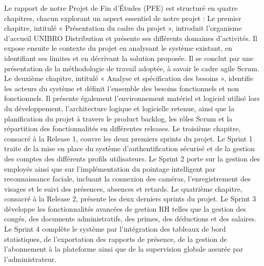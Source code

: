 Le rapport de notre Projet de Fin d’Études (PFE) est structuré en quatre chapitres, chacun explorant un aspect essentiel de notre projet :
Le premier chapitre, intitulé « Présentation du cadre du projet », introduit l’organisme d’accueil UNIBRO Distribution et présente ses différents domaines d’activités. Il expose ensuite le contexte du projet en analysant le système existant, en identifiant ses limites et en décrivant la solution proposée. Il se conclut par une présentation de la méthodologie de travail adoptée, à savoir le cadre agile Scrum.
Le deuxième chapitre, intitulé « Analyse et spécification des besoins », identifie les acteurs du système et définit l’ensemble des besoins fonctionnels et non fonctionnels. Il présente également l’environnement matériel et logiciel utilisé lors du développement, l’architecture logique et logicielle retenue, ainsi que la planification du projet à travers le product backlog, les rôles Scrum et la répartition des fonctionnalités en différentes releases.
Le troisième chapitre, consacré à la Release 1, couvre les deux premiers sprints du projet. Le Sprint 1 traite de la mise en place du système d’authentification sécurisé et de la gestion des comptes des différents profils utilisateurs. Le Sprint 2 porte sur la gestion des employés ainsi que sur l’implémentation du pointage intelligent par reconnaissance faciale, incluant la connexion des caméras, l’enregistrement des visages et le suivi des présences, absences et retards.
Le quatrième chapitre, consacré à la Release 2, présente les deux derniers sprints du projet. Le Sprint 3 développe les fonctionnalités avancées de gestion RH telles que la gestion des congés, des documents administratifs, des primes, des déductions et des salaires. Le Sprint 4 complète le système par l’intégration des tableaux de bord statistiques, de l’exportation des rapports de présence, de la gestion de l’abonnement à la plateforme ainsi que de la supervision globale assurée par l’administrateur.
\clearpage
\mtcaddchapter